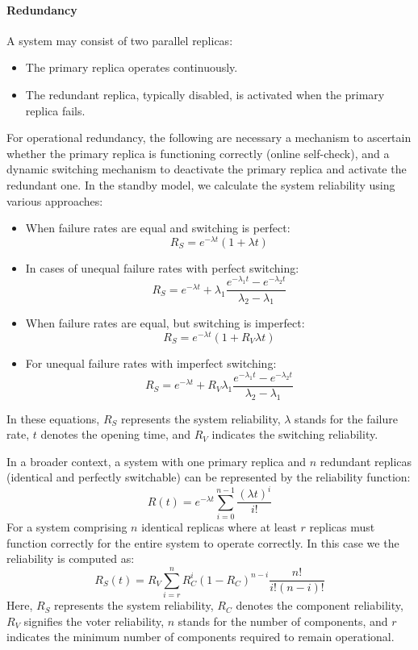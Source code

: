 \paragraph*{Redundancy}
A system may consist of two parallel replicas:
\begin{itemize}
    \item The primary replica operates continuously.
    \item The redundant replica, typically disabled, is activated when the primary replica fails.
\end{itemize}
For operational redundancy, the following are necessary a mechanism to ascertain whether the primary replica is functioning correctly (online self-check), and a dynamic switching mechanism to deactivate the primary replica and activate the redundant one.
In the standby model, we calculate the system reliability using various approaches:
\begin{itemize}
    \item When failure rates are equal and switching is perfect:
        \[R_S=e^{-\lambda t}(1+\lambda t)\]
    \item In cases of unequal failure rates with perfect switching:
        \[R_S=e^{-\lambda t}+\lambda_1 \dfrac{e^{-\lambda_1 t}-e^{-\lambda_2 t}}{\lambda_2-\lambda_1}\]
    \item When failure rates are equal, but switching is imperfect:
        \[R_S=e^{-\lambda t}(1+R_V\lambda t)\]
    \item For unequal failure rates with imperfect switching:
        \[R_S=e^{-\lambda t}+R_V\lambda_1 \dfrac{e^{-\lambda_1 t}-e^{-\lambda_2 t}}{\lambda_2-\lambda_1}\]
\end{itemize}
In these equations, $R_S$ represents the system reliability, $\lambda$ stands for the failure rate, $t$ denotes the opening time, and $R_V$ indicates the switching reliability.

In a broader context, a system with one primary replica and $n$ redundant replicas (identical and perfectly switchable) can be represented by the reliability function:
\[R(t)=e^{-\lambda t}\sum_{i=0}^{n-1}\dfrac{\left(\lambda t\right)^i}{i!}\]
For a system comprising $n$ identical replicas where at least $r$ replicas must function correctly for the entire system to operate correctly. 
In this case we the reliability is computed as: 
\[R_S(t)=R_V\sum_{i=r}^{n}R_C^i(1-R_C)^{n-i}\dfrac{n!}{i!(n-i)!}\]
Here, $R_S$ represents the system reliability, $R_C$ denotes the component reliability, $R_V$ signifies the voter reliability, $n$ stands for the number of components, and $r$ indicates the minimum number of components required to remain operational.

